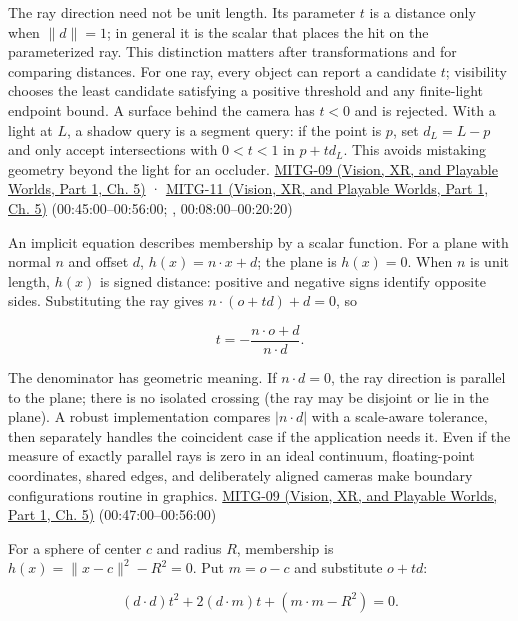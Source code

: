 The ray direction need not be unit length. Its parameter \(t\) is a distance only when \(\|d\|=1\); in general it is the scalar that places the hit on the parameterized ray. This distinction matters after transformations and for comparing distances. For one ray, every object can report a candidate \(t\); visibility chooses the least candidate satisfying a positive threshold and any finite-light endpoint bound. A surface behind the camera has \(t<0\) and is rejected. With a light at \(L\), a shadow query is a segment query: if the point is \(p\), set \(d_L=L-p\) and only accept intersections with \(0<t<1\) in \(p+td_L\). This avoids mistaking geometry beyond the light for an occluder. \href{../07-Vision-XR-and-Playable-Worlds-P01/main.pdf\#nameddest=04-visual-computing-ii-ch036-mitg-09---ray-casting}{MITG-09 (Vision, XR, and Playable Worlds, Part 1, Ch. 5)} · \href{../07-Vision-XR-and-Playable-Worlds-P01/main.pdf\#nameddest=04-visual-computing-ii-ch036-mitg-11---ray-tracing}{MITG-11 (Vision, XR, and Playable Worlds, Part 1, Ch. 5)} (00:45:00--00:56:00; , 00:08:00--00:20:20)

An implicit equation describes membership by a scalar function. For a plane with normal \(n\) and offset \(d\), \(h(x)=n\cdot x+d\); the plane is \(h(x)=0\). When \(n\) is unit length, \(h(x)\) is signed distance: positive and negative signs identify opposite sides. Substituting the ray gives \(n\cdot(o+td)+d=0\), so

\[
t=-\frac{n\cdot o+d}{n\cdot d}.
\]

The denominator has geometric meaning. If \(n\cdot d=0\), the ray direction is parallel to the plane; there is no isolated crossing (the ray may be disjoint or lie in the plane). A robust implementation compares \(|n\cdot d|\) with a scale-aware tolerance, then separately handles the coincident case if the application needs it. Even if the measure of exactly parallel rays is zero in an ideal continuum, floating-point coordinates, shared edges, and deliberately aligned cameras make boundary configurations routine in graphics. \href{../07-Vision-XR-and-Playable-Worlds-P01/main.pdf\#nameddest=04-visual-computing-ii-ch036-mitg-09---ray-casting}{MITG-09 (Vision, XR, and Playable Worlds, Part 1, Ch. 5)} (00:47:00--00:56:00)

For a sphere of center \(c\) and radius \(R\), membership is \(h(x)=\|x-c\|^2-R^2=0\). Put \(m=o-c\) and substitute \(o+td\):

\[
(d\cdot d)t^2+2(d\cdot m)t+(m\cdot m-R^2)=0.
\]

